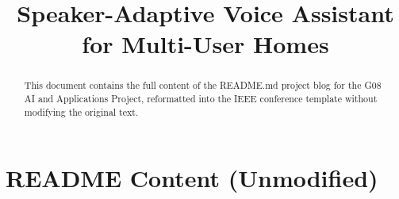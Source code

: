 \documentclass[conference]{IEEEtran}
\begin{document}
\title{Speaker-Adaptive Voice Assistant for Multi-User Homes}

\author{
}

\maketitle

\begin{abstract}
This document contains the full content of the README.md project blog for the G08 AI and Applications Project, reformatted into the IEEE conference template without modifying the original text.
\end{abstract}

\section*{README Content (Unmodified)}
\end{document}
